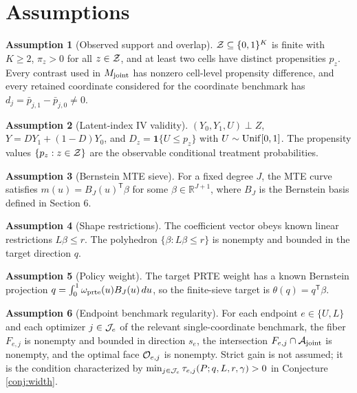 \documentclass[11pt]{article}
\newcommand{\one}{\mathbf{1}}
\newcommand{\transpose}{\mathsf{T}}
\newcommand{\R}{\mathbb{R}}
\theoremstyle{definition}
\newtheorem{assumption}{Assumption}
\theoremstyle{plain}
\theoremstyle{remark}
\begin{document}
\section{Assumptions}
\begin{assumption}[Observed support and overlap]\label{ass:support}
\({\cal Z}\subseteq\{0,1\}^K\) is finite with \(K\ge2\), \(\pi_z>0\) for all
\(z\in{\cal Z}\), and at least two cells have distinct propensities \(p_z\).
Every contrast used in \(M_{\rm joint}\) has nonzero cell-level propensity
difference, and every retained coordinate considered for the coordinate
benchmark has \(d_j=\bar p_{j,1}-\bar p_{j,0}\ne0\).
\end{assumption}

\begin{assumption}[Latent-index IV validity]\label{ass:latent}
\((Y_0,Y_1,U)\perp Z\), \(Y=DY_1+(1-D)Y_0\), and
\(D_z=\one\{U\le p_z\}\) with \(U\sim{\rm Unif}[0,1]\).  The propensity values
\(\{p_z:z\in{\cal Z}\}\) are the observable conditional treatment
probabilities.
\end{assumption}

\begin{assumption}[Bernstein MTE sieve]\label{ass:bernstein}
For a fixed degree \(J\), the MTE curve satisfies
\(m(u)=B_J(u)^\transpose\beta\) for some \(\beta\in\R^{J+1}\), where \(B_J\) is
the Bernstein basis defined in Section 6.
\end{assumption}

\begin{assumption}[Shape restrictions]\label{ass:shape}
The coefficient vector obeys known linear restrictions \(L\beta\le r\).  The
polyhedron \(\{\beta:L\beta\le r\}\) is nonempty and bounded in the target
direction \(q\).
\end{assumption}

\begin{assumption}[Policy weight]\label{ass:policy}
The target PRTE weight has a known Bernstein projection
\(q=\int_0^1\omega_{\rm prte}(u)B_J(u)\,du\), so the finite-sieve target is
\(\theta(q)=q^\transpose\beta\).
\end{assumption}

\begin{assumption}[Endpoint benchmark regularity]\label{ass:nonredundant}
For each endpoint \(e\in\{U,L\}\) and each optimizer \(j\in{\cal J}_e\) of
the relevant single-coordinate benchmark, the fiber \(F_{e,j}\) is nonempty
and bounded in direction \(s_e\), the intersection
\(F_{e,j}\cap{\cal A}_{\rm joint}\) is nonempty, and the optimal face
\({\cal O}_{e,j}\) is nonempty.  Strict gain is not assumed; it is the
condition characterized by
\(\min_{j\in{\cal J}_e}\tau_{e,j}(P;q,L,r,\gamma)>0\) in Conjecture
\ref{conj:width}.
\end{assumption}
\end{document}
